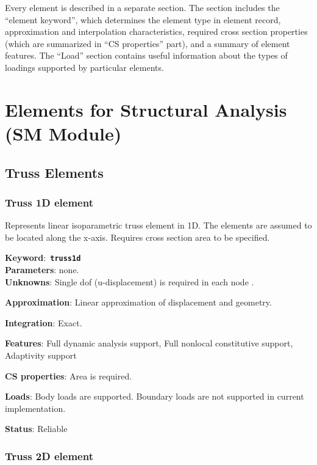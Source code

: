 \documentclass[a4paper]{article}
\newcommand{\descitem}[1]{{\noindent \bf #1}:}
\newcommand{\elemkeyword}[1]{\descitem{Keyword}~{\bf \texttt{#1}}}
\begin{document}
Every element is described in a separate section. The section includes the ``element keyword'', which
determines the element type in element record, approximation and
interpolation characteristics, required cross section properties
(which are summarized in ``CS properties'' part), and a summary of
element features. The ``Load'' section contains useful
information about the types of loadings supported by particular elements.



\section{Elements for Structural Analysis\\(SM Module)}
\subsection{Truss Elements}

\subsubsection{Truss 1D element}
\label{Truss1d}

Represents linear isoparametric truss element in 1D. The elements are
assumed to be located along the x-axis. Requires cross section area to be
specified.

\elemkeyword{truss1d}\\
\descitem{Parameters} none.\\
\descitem{Unknowns}
Single dof (u-displacement) is required in each node .

\descitem{Approximation} Linear approximation of displacement and geometry.

\descitem{Integration} Exact.

\descitem{Features} Full dynamic analysis support, Full nonlocal
constitutive support, Adaptivity support

\descitem{CS properties} Area is required.

\descitem{Loads} Body loads are supported. Boundary loads are
not supported in current implementation.

\descitem{Status} Reliable

\subsubsection{Truss 2D element}
\label{Truss2d}
\end{document}

